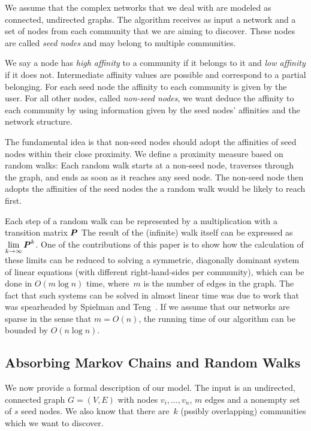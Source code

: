 We assume that the complex networks that we deal with are modeled as connected, undirected graphs.  
The algorithm receives as input a network and a set of nodes from each community that we are aiming to discover. 
These nodes are called \emph{seed nodes} and may belong to multiple communities.

We say a node has \emph{high affinity} to a community if it belongs to it and \emph{low affinity} if it does not.
Intermediate affinity values are possible and correspond to a partial belonging.
For each seed node the affinity to each community is given by the user.
For all other nodes, called \emph{non-seed nodes}, we want deduce the affinity 
to each community by using information given by the seed nodes' affinities and the network structure.

The fundamental idea is that non-seed nodes should adopt the affinities of seed nodes within their close proximity.
We define a proximity measure based on random walks:
Each random walk starts at a non-seed node, traverses through the graph, and ends as soon as it reaches any seed node.
The non-seed node then adopts the affinities of the seed nodes the a random walk would be likely to reach first.

Each step of a random walk can be represented by a multiplication with a transition matrix $\boldsymbol{P}$ 
The result of the (infinite) walk itself can be expressed as $\lim \limits_{k \rightarrow \infty}{\boldsymbol{P}^k}$.
One of the contributions of this paper is to show how the calculation
of these limits can be reduced to solving a symmetric, diagonally dominant
system of linear equations (with different right-hand-sides per community),
which can be done in $O(m \log n)$ time, where~$m$ is the number of edges 
in the graph. The fact that such systems can be solved in almost linear time 
was due to work that was spearheaded by Spielman and 
Teng~\cite{ST04,EEST05,ST08,KMP10,KMP11,Vis13}. If we assume that our networks are 
sparse in the sense that $m = O(n)$, the running time of our algorithm can  
be bounded by $O(n \log n)$.    

        
\subsection{Absorbing Markov Chains and Random Walks}
We now provide a formal description of our model. 
The input is an undirected, connected graph $G=(V,E)$ with nodes $v_i, \dots, v_n$, $m$ edges and a nonempty set of $s$ seed nodes.
We also know that there are~$k$ (pssibly overlapping) communities which we want to discover.

